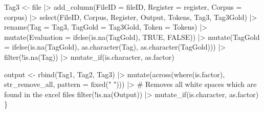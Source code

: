 \documentclass[
  letterpaper,
  DIV=11,
  numbers=noendperiod]{scrreprt}
\newenvironment{Shaded}{\begin{snugshade}}{\end{snugshade}}
\newcommand{\AttributeTok}[1]{\textcolor[rgb]{0.40,0.45,0.13}{#1}}
\newcommand{\CommentTok}[1]{\textcolor[rgb]{0.37,0.37,0.37}{#1}}
\newcommand{\ConstantTok}[1]{\textcolor[rgb]{0.56,0.35,0.01}{#1}}
\newcommand{\FunctionTok}[1]{\textcolor[rgb]{0.28,0.35,0.67}{#1}}
\newcommand{\NormalTok}[1]{\textcolor[rgb]{0.00,0.23,0.31}{#1}}
\newcommand{\OtherTok}[1]{\textcolor[rgb]{0.00,0.23,0.31}{#1}}
\newcommand{\SpecialCharTok}[1]{\textcolor[rgb]{0.37,0.37,0.37}{#1}}
\newcommand{\StringTok}[1]{\textcolor[rgb]{0.13,0.47,0.30}{#1}}
\begin{document}
\begin{Shaded}
\begin{Highlighting}[]
\NormalTok{Tag3 }\OtherTok{\textless{}{-}}\NormalTok{ file }\SpecialCharTok{|\textgreater{}} 
  \FunctionTok{add\_column}\NormalTok{(}\AttributeTok{FileID =}\NormalTok{ fileID, }\AttributeTok{Register =}\NormalTok{ register, }\AttributeTok{Corpus =}\NormalTok{ corpus) }\SpecialCharTok{|\textgreater{}}
  \FunctionTok{select}\NormalTok{(FileID, Corpus, Register, Output, Tokens, Tag3, Tag3Gold) }\SpecialCharTok{|\textgreater{}} 
  \FunctionTok{rename}\NormalTok{(}\AttributeTok{Tag =}\NormalTok{ Tag3, }\AttributeTok{TagGold =}\NormalTok{ Tag3Gold, }\AttributeTok{Token =}\NormalTok{ Tokens) }\SpecialCharTok{|\textgreater{}} 
  \FunctionTok{mutate}\NormalTok{(}\AttributeTok{Evaluation =} \FunctionTok{ifelse}\NormalTok{(}\FunctionTok{is.na}\NormalTok{(TagGold), }\ConstantTok{TRUE}\NormalTok{, }\ConstantTok{FALSE}\NormalTok{)) }\SpecialCharTok{|\textgreater{}} 
  \FunctionTok{mutate}\NormalTok{(}\AttributeTok{TagGold =} \FunctionTok{ifelse}\NormalTok{(}\FunctionTok{is.na}\NormalTok{(TagGold), }\FunctionTok{as.character}\NormalTok{(Tag), }\FunctionTok{as.character}\NormalTok{(TagGold))) }\SpecialCharTok{|\textgreater{}}
  \FunctionTok{filter}\NormalTok{(}\SpecialCharTok{!}\FunctionTok{is.na}\NormalTok{(Tag)) }\SpecialCharTok{|\textgreater{}} 
  \FunctionTok{mutate\_if}\NormalTok{(is.character, as.factor)}

\NormalTok{output }\OtherTok{\textless{}{-}} \FunctionTok{rbind}\NormalTok{(Tag1, Tag2, Tag3) }\SpecialCharTok{|\textgreater{}} 
  \FunctionTok{mutate}\NormalTok{(}\FunctionTok{across}\NormalTok{(}\FunctionTok{where}\NormalTok{(is.factor), str\_remove\_all, }\AttributeTok{pattern =} \FunctionTok{fixed}\NormalTok{(}\StringTok{" "}\NormalTok{))) }\SpecialCharTok{|\textgreater{}} \CommentTok{\# Removes all white spaces which are found in the excel files}
  \FunctionTok{filter}\NormalTok{(}\SpecialCharTok{!}\FunctionTok{is.na}\NormalTok{(Output)) }\SpecialCharTok{|\textgreater{}} 
  \FunctionTok{mutate\_if}\NormalTok{(is.character, as.factor)}
\NormalTok{\}}


\end{Highlighting}
\end{Shaded}
\end{document}

